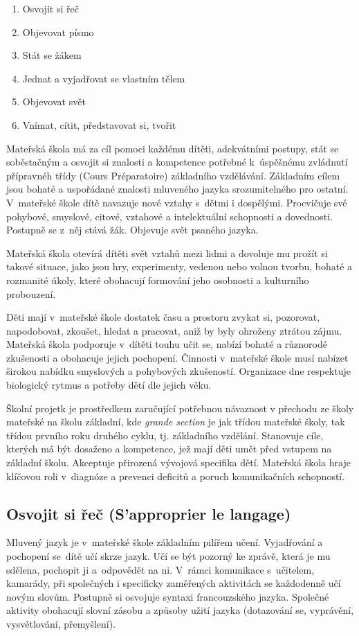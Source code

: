 	\begin{enumerate}[1]
		\setlength\itemsep{-2mm}
		\item Osvojit si řeč 
		\item Objevovat písmo 
		\item Stát se žákem 
		\item Jednat a vyjadřovat se vlastním tělem 
		\item Objevovat svět
		\item Vnímat, cítit, představovat si, tvořit
	\end{enumerate}

	Mateřská škola má za cíl pomoci každému dítěti, adekvátními postupy, stát se soběstačným a osvojit si znalosti a kompetence potřebné k úspěšnému zvládnutí přípravnéh třídy (Cours Préparatoire) základního vzdělávání. Základním cílem jsou bohaté a uspořádané znalosti mluveného jazyka srozumitelného pro ostatní. V mateřské škole dítě navazuje nové vztahy s dětmi i dospělými. Procvičuje své pohybové, smyslové, citové, vztahové a intelektuální schopnosti a dovednosti. Postupně se z něj stává žák. Objevuje svět psaného jazyka. 

	Mateřská škola otevírá dítěti svět vztahů mezi lidmi a dovoluje mu prožít si takové situace, jako jsou hry, experimenty, vedenou nebo volnou tvorbu, bohaté a rozmanité úkoly, které obohacují formování jeho osobnosti a kulturního probouzení. 

	Děti mají v mateřské škole dostatek času a prostoru zvykat si, pozorovat, napodobovat, zkoušet, hledat a pracovat, aniž by byly ohroženy ztrátou zájmu. Mateřská škola podporuje v dítěti touhu učit se, nabízí bohaté a různorodé zkušenosti a obohacuje jejich pochopení. 
	Činnosti v mateřské škole musí nabízet širokou nabídku smyslových a pohybových zkušeností. Organizace dne respektuje biologický rytmus a potřeby dětí dle jejich věku. 

	Školní projetk je prostředkem zaručující potřebnou návaznost v přechodu ze školy mateřské na školu základní, kde \textit{grande section} je jak třídou mateřské školy, tak třídou prvního roku druhého cyklu, tj. základního vzdělání. Stanovuje cíle, kterých má být dosaženo a kompetence, jež mají děti umět před vstupem na základní školu. Akceptuje přirozená vývojová specifika dětí. Mateřská škola hraje klíčovou roli v diagnóze a prevenci deficitů a poruch komunikačních schopností.

		\subsection{Osvojit si řeč (S'approprier le langage)}
			Mluvený jazyk je v mateřské škole základním pilířem učení. Vyjadřování a pochopení se dítě učí skrze jazyk. Učí se být pozorný ke zprávě, která je mu sdělena, pochopit ji a odpovědět na ni. V rámci komunikace s učitelem, kamarády, při společných i specificky zaměřených aktivitách se každodenně učí novým slovům. Postupně si osvojuje syntaxi francouzského jazyka. Společné aktivity obohacují slovní zásobu a způsoby užití jazyka (dotazování se, vyprávění, vysvětlování, přemyšlení).

